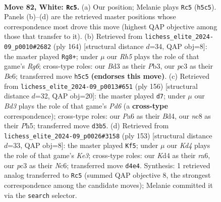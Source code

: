\documentclass[11pt]{article}
\begin{document}
\clearpage

\begin{figure}[p]\centering
\begin{subfigure}{0.46\textwidth}\centering
\resizebox{\linewidth}{!}{%
\newchessgame
\chessboard[
  setfen={2n5/6r1/P2k4/7R/3K4/2pB2PP/2P5/8 w - - 3 82},
  showmover=false,
  pgfstyle=straightmove, color=movearrow, markmove={h5-c5}
]}
\caption{}
\end{subfigure}\hfill
\begin{subfigure}{0.46\textwidth}\centering
\resizebox{\linewidth}{!}{%
\newchessgame
\chessboard[
  setfen={4r2k/7P/4B1RK/8/1p6/1P3P2/2p5/8 w - - 0 83},
  showmover=false,
  pgfstyle=straightmove, color=movearrow, markmove={g6-g8}
]}
\caption{}
\end{subfigure}
\\[4pt]
\begin{subfigure}{0.46\textwidth}\centering
\resizebox{\linewidth}{!}{%
\newchessgame
\chessboard[
  setfen={3R2b1/7k/3P4/6KP/2pB4/2P2r1P/8/8 w - - 4 79},
  showmover=false,
  pgfstyle=straightmove, color=movearrow, markmove={d6-d7}
]}
\caption{}
\end{subfigure}\hfill
\begin{subfigure}{0.46\textwidth}\centering
\resizebox{\linewidth}{!}{%
\newchessgame
\chessboard[
  setfen={8/8/R1nbk1p1/7p/4bp1P/8/1B6/6K1 b - - 1 77},
  showmover=false,
  pgfstyle=straightmove, color=movearrow, markmove={e6-f5}
]}
\caption{}
\end{subfigure}
\caption{\textbf{Move 82, White: \texttt{Rc5}.} (a) Our position; Melanie plays \texttt{Rc5} (\texttt{h5c5}). Panels (b)--(d) are the retrieved master positions whose correspondence most drove this move (highest QAP objective among those that transfer to it). (b) Retrieved from \texttt{lichess\_elite\_2024-09\_p0010\#2682} (ply 164) [structural distance $d$=34, QAP obj=8]: the master played \texttt{Rg8+}; under $\mu$ our \emph{Rh5} plays the role of that game's \emph{Rg6}; cross-type roles: our \emph{B}d3 as their \emph{P}b3, our \emph{p}c3 as their \emph{B}e6; transferred move \texttt{h5c5} \textbf{(endorses this move)}. (c) Retrieved from \texttt{lichess\_elite\_2024-09\_p0013\#651} (ply 156) [structural distance $d$=32, QAP obj=20]: the master played \texttt{d7}; under $\mu$ our \emph{Bd3} plays the role of that game's \emph{Pd6} (a \textbf{cross-type} correspondence); cross-type roles: our \emph{P}a6 as their \emph{B}d4, our \emph{n}c8 as their \emph{P}h5; transferred move \texttt{d3b5}. (d) Retrieved from \texttt{lichess\_elite\_2024-09\_p0026\#3158} (ply 153) [structural distance $d$=33, QAP obj=8]: the master played \texttt{Kf5}; under $\mu$ our \emph{Kd4} plays the role of that game's \emph{Ke3}; cross-type roles: our \emph{K}d4 as their \emph{r}a6, our \emph{p}c3 as their \emph{N}c6; transferred move \texttt{d4e4}. Synthesis: 1 retrieved analog transferred to \texttt{Rc5} (summed QAP objective 8, the strongest correspondence among the candidate moves); Melanie committed it via the \texttt{search} selector.}
\label{fig:thought-m162}
\end{figure}
\end{document}
